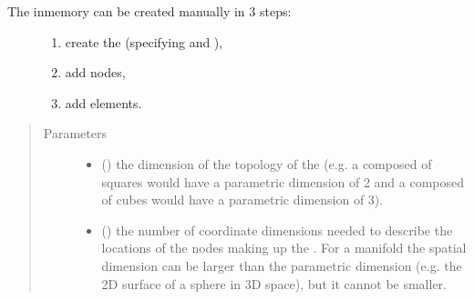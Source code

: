\documentclass[letterpaper,10pt,english]{sphinxmanual}
\begin{document}
\begin{fulllineitems}
\begin{description}
\item[{The in\sphinxhyphen{}memory {\hyperref[\detokenize{mesh:ESMF.api.mesh.Mesh}]{}} can be created manually in 3 steps:}] \leavevmode\begin{enumerate}
%
\item {} 
create the {\hyperref[\detokenize{mesh:ESMF.api.mesh.Mesh}]{}} (specifying  and ),

\item {} 
add nodes,

\item {} 
add elements.

\end{enumerate}

\end{description}

\begin{quote}\begin{description}
\item[{Parameters}] \leavevmode\begin{itemize}
\item {} 
 () \textendash{} the dimension of the topology of the
{\hyperref[\detokenize{mesh:ESMF.api.mesh.Mesh}]{}} (e.g. a {\hyperref[\detokenize{mesh:ESMF.api.mesh.Mesh}]{}} composed of squares would have a
parametric dimension of 2 and a {\hyperref[\detokenize{mesh:ESMF.api.mesh.Mesh}]{}} composed of cubes
would have a parametric dimension of 3).

\item {} 
 () \textendash{} the number of coordinate dimensions
needed to describe the locations of the nodes making up the
{\hyperref[\detokenize{mesh:ESMF.api.mesh.Mesh}]{}}.  For a manifold the spatial dimension can be larger
than the parametric dimension (e.g. the 2D surface of a
sphere in 3D space), but it cannot be smaller.


\end{itemize}
\end{description}
\end{quote}
\end{fulllineitems}
\end{document}
